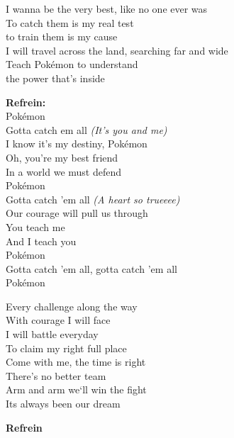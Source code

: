 
I wanna be the very best, like no one ever was\\
To catch them is my real test\\
to train them is my cause\\
I will travel across the land, searching far and wide\\
Teach Pokémon to understand\\
the power that's inside 

\textbf{Refrein:}\\
Pokémon\\
Gotta catch em all \textit{(It's you and me)}\\
I know it's my destiny, Pokémon\\
Oh, you're my best friend\\
In a world we must defend\\
Pokémon\\
Gotta catch 'em all \textit{(A heart so trueeee)}\\
Our courage will pull us through\\
You teach me\\
And I teach you\\
Pokémon\\
Gotta catch 'em all, gotta catch 'em all\\
Pokémon

Every challenge along the way\\
With courage I will face\\
I will battle everyday\\
To claim my right full place\\
Come with me, the time is right\\
There's no better team\\
Arm and arm we`ll win the fight\\
Its always been our dream

\textbf{Refrein}
